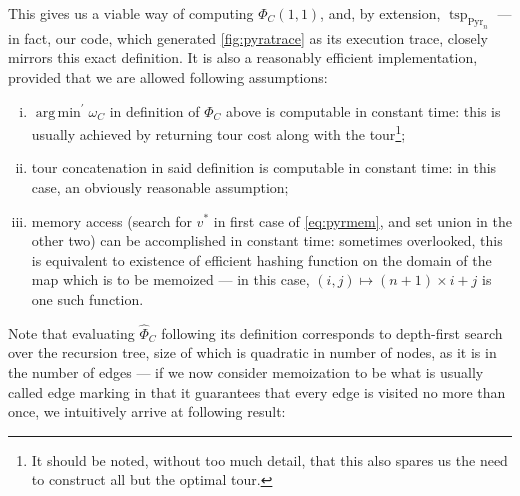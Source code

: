 \documentclass[index=totoc,bibliography=totoc]{scrartcl}
\DeclareMathOperator*{\argmin}{arg\,min}
\numberwithin{equation}{section}
\numberwithin{figure}{section}
\numberwithin{table}{section}
\begin{document}
\begin{remark}
\label{rem:timeass}
This gives us a viable way of computing $\Phi_C\left(1,1\right)$, and, by extension,
$\operatorname{tsp}_{\operatorname{Pyr}_n}$ --- in fact, our code, which
generated \cref{fig:pyratrace} as its execution trace, closely mirrors this exact
definition.
It is also a reasonably efficient implementation, provided that we are
allowed following assumptions:
  \begin{enumerate}[(i)]
    \item
      $\argmin^\prime \omega_C$ in definition of $\Phi_C$ above is computable in constant time:
      this is usually achieved by returning tour cost along with the
      tour\footnote{%
        It should be noted, without too much detail, that this also spares
        us the need to construct all but the optimal tour.
      };
    \item
      tour concatenation in said definition is computable in constant time:
      in this case, an obviously reasonable assumption;
    \item
      memory access (search for $v^\ast$ in first case of \eqref{eq:pyrmem},
      and set union in the other two) can be accomplished in constant time:
      sometimes overlooked, this is equivalent to existence of efficient hashing
      function on the domain of the map which is to be memoized ---
      in this case, $(i,j) \mapsto (n+1)\times i + j$ is one such function.
  \end{enumerate}
\end{remark}

Note that evaluating $\widehat{\Phi}_C$ following its definition corresponds to
depth-first search over the recursion tree, size of which is quadratic in number of nodes,
as it is in the number of edges --- if we now consider memoization to be what
is usually called edge marking in that it guarantees that every edge
is visited no more than once, we intuitively arrive at following result:
\end{document}
